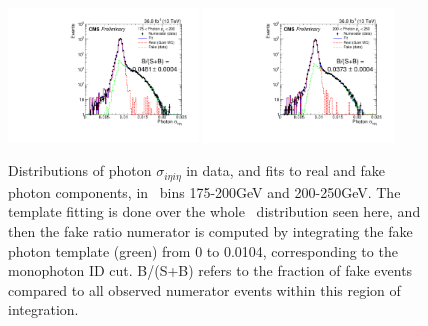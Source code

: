 \begin{figure}[hbtp]
  \begin{center}
  \includegraphics[width=0.45\textwidth]{Figures/QCD/num_fit_175to200.pdf}
  \includegraphics[width=0.45\textwidth]{Figures/QCD/num_fit_200to250.pdf}
  \caption{Distributions of photon $\sigma_{i\eta i\eta}$ in data, and fits to real and fake photon components, in \ETgamma\ bins 175-200\unit{GeV} and 200-250\unit{GeV}.
  The template fitting is done over the whole \sieie\ distribution seen here, and then the fake ratio numerator is computed by integrating the fake photon template (green)
  from 0 to 0.0104, corresponding to the monophoton ID cut. B/(S+B) refers to the fraction of fake events compared to all observed numerator events within this region of integration.}
  \label{fig:qcd_fits_a}
  \end{center}
\end{figure}

